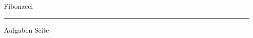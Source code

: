 
\begin{slide}{}
\normalsize

\begin{center}
Fibonacci
\end{center}
\vspace*{0.5cm}

\footnotesize


\vspace*{\fill}
\tiny \addtocounter{mypage}{1}
\rule{17cm}{1mm}
Aufgaben  \hspace*{\fill} Seite 
\end{slide}


